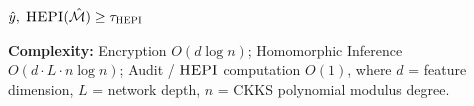 \begin{algorithm*}[tp]
{  \Return $\hat{y},\; \textsc{HEPI}(\hat{\mathcal{M}}) \geq \tau_{\textsc{HEPI}}$
    \;
}

\BlankLine
\textbf{Complexity:}
Encryption $O(d \log n)$;
Homomorphic Inference $O(d \cdot L \cdot n \log n)$;
Audit / $\textsc{HEPI}$ computation $O(1)$,
where $d$ = feature dimension, $L$ = network depth, $n$ = CKKS polynomial
modulus degree.
\end{algorithm*}
